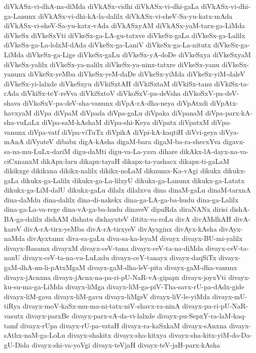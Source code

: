 {diVkASx-vi-dhA-na-diMda
diVkASx-vidhi
diVkASx-vi-dhi-gaLa
diVkASx-vi-dhi-ga-Lanunx
diVkASx-vi-dhi-kA-la-dalilx
diVkASx-vi-sheV-Sa-yu-katx-mAda
diVkASx-vi-sheV-Sa-yu-katx-vAda
diVkASxyAM
diVkASx-yaM-tarx-ga-LiMda
diVkeSx
diVkeSxVti
diVkeSx-ga-LA-gu-tatxve
diVkeSx-gaLa
diVkeSx-ga-Lalilx
diVkeSx-ga-La-lolxM-dAda
diVkeSx-ga-LaniV
diVkeSx-ga-La-nitutx
diVkeSx-ga-LiMda
diVkeSx-ga-Lige
diVkeSx-gaLu
diVkeSx-yA-doDe
diVkeSxya
diVkeSxyaM
diVkeSx-yalilx
diVkeSx-ya-nalilx
diVkeSx-ya-ninx-tatxre
diVkeSx-yanu
diVkeSx-yanunx
diVkeSx-yeMba
diVkeSx-yeM-daDe
diVkeSx-yiMda
diVkeSx-yiM-daleV
diVkeSx-yi-lalxde
diVkeSxyu
diVkiSxtAH
diVkiSxtaM
diVkiSx-tanu
diVkiSx-ta-rAda
diVkiSx-teY-reVva
diVkiSxtoV
diVkoSxV-pa-deVsha
diVkoSxV-pa-deV-shava
diVkoSxV-pa-deV-sha-vanunx
diVpA-rA-dha-neya
diVpAtxdi
diVpAtx-havxyaM
diVpa
diVpaM
diVpada
diVpa-gaLu
diVpaka
diVpanaM
diVpa-parx-kA-sha-vuLaLx
diVpa-saM-kAshaM
diVpa-shi-Keya
diVpatx
diVpatxM
diVpa-vanunx
diVpa-vatf
diVpa-viTuTx
diVpikA
diVpi-kA-kaqtiH
diVvi-geya
diVya-mAnA
diVyateV
dibabx
digA-kAsha
digaM-bara
digaM-ba-ra-shecxYva
digavx-sa-na-mu-LuLx-dariM
digu-daMti
digu-va-La-yava
dihare
dikAkx-lA-dayx-na-va-ciCxnanxM
dikApx-laru
dikapx-tayaH
dikapx-ta-yashacx
dikapx-ti-gaLaM
dikikxge
dikikxna
dikikx-nalilx
dikikx-noLaM
diknumx-Ka-vAgi
dikukx
dikukx-gaLa
dikukx-ga-Lalilx
dikukx-ga-La-lilxyU
dikukx-ga-Lanunx
dikukx-ga-Latatx
dikukx-ga-LiM-dalU
dikukx-gaLu
dilalx
dilalxvu
dina
dinaM-gaLu
dinaM-tarxnA
dina-daMdu
dina-dalilx
dina-di-nakekx
dina-ga-LA-ga-ba-hudu
dina-ga-Lalilx
dina-ga-La-va-rege
dina-vA-ga-ba-hudu
dinaveV
dipuRda
diraNANx
dirisi
dishA-BA-ga-dalilx
dishAM
dishatu
dishayxteV
dititx-va-roLu
divA
divAMdhAH
divA-kareV
divA-rA-tirx-yeMba
divA-rA-tirxyeV
divAyxginx
divAyx-kAsha
divAyx-naMda
divAyxtamx
diva-sa-gaLu
diva-sa-ka-leyaM
divayx
divayx-BU-mi-yalilx
divayx-Basamx
divayxM
divayx-ceV-tana
divayx-ceV-ta-na-diMda
divayx-ceV-ta-nanU
divayx-ceV-ta-na-vu-LuLxdu
divayx-ceY-tanayx
divayx-daqSiTx
divayx-gaM-dhA-nu-li-pAtxMgaM
divayx-gaM-dha-leV-pita
divayx-gaM-dha-vanunx
divayx-jAcnxna
divayx-jAcnx-na-pa-ri-pU-NaR-vA-gipapx
divayx-joyxVti
divayx-ku-su-ma-ga-LiMda
divayx-liMga
divayx-liM-ga-piV-Tha-savx-rU-pa-dAdx-gide
divayx-liM-gava
divayx-liM-gavu
divayx-liMgeV
divayx-liV-le-yiMda
divayx-mU-tiRya
divayx-moV-kaSx-mu-ma-ni-tatx-niV-shavx-ra-ninA
divayx-pa-ri-pU-NaR-vasutx
divayx-parxBe
divayx-parx-sA-da-vi-lalxde
divayx-pu-SepxY-ra-laM-kaq-tamf
divayx-rUpa
divayx-rU-pa-vataH
divayx-ra-kaSxkaM
divayx-sAnxna
divayx-sAthx-naM-ga-LoLu
divayx-shakitx
divayx-sha-kitxya
divayx-sha-kitx-yiM-do-Da-gU-Dida
divayx-shi-va-yoVgi
divayx-teVjaH
divayx-teV-jaH-parx-kAsha
}
